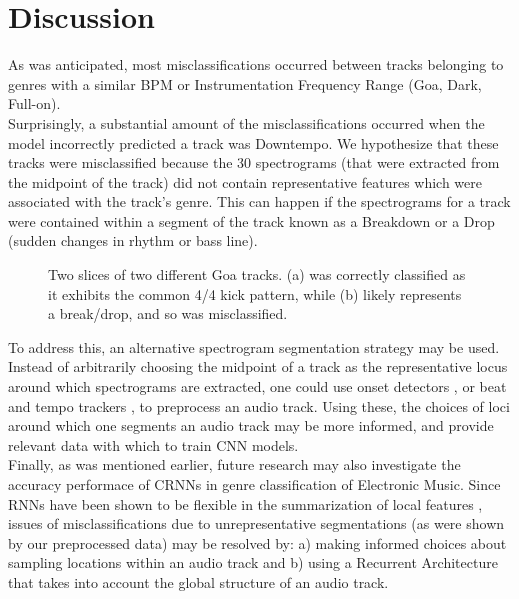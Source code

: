 \documentclass[12pt]{article}
\newcounter{ct}
\begin{document}
\section*{Discussion}
As was anticipated, most misclassifications occurred between tracks
belonging to
genres with a similar BPM or Instrumentation Frequency Range 
(Goa, Dark, Full-on). \\Surprisingly, a substantial amount of 
the misclassifications occurred when the model 
incorrectly predicted a track
was Downtempo. We hypothesize that these tracks were misclassified 
because the 30 spectrograms (that were
extracted from the midpoint of the track) 
did not contain representative features which were associated 
with the track's genre. This can happen if the spectrograms 
for a track were contained within a segment of the 
track known as a Breakdown or a Drop (sudden changes in 
rhythm or bass line).
\begin{figure}[H]%
    \centering
    \qquad\hspace{15mm}
    \caption{
        Two slices of two different Goa tracks. (a) was correctly 
        classified as it exhibits the common 4/4 kick pattern, while 
        (b) likely represents a break/drop, and so was misclassified.           
        }       
    \label{fig:example}%
\end{figure}

To address this, an alternative spectrogram segmentation strategy may 
be used.\\ Instead of arbitrarily choosing the midpoint of a track as the 
representative locus around which spectrograms are extracted,
one could use onset detectors \cite{c14}, or beat and tempo trackers 
\cite{c15}, to 
preprocess an audio track. Using these, the choices of loci
around which one segments an audio track may be more informed,
and provide relevant data with which to train CNN models.\\
Finally, as was mentioned earlier, future research may also 
investigate the accuracy performace of CRNNs in genre classification
of Electronic Music. Since RNNs have been shown to be flexible 
in the summarization of local features \cite{c6}, issues 
of misclassifications due to unrepresentative segmentations (as were
shown by our preprocessed data) may be resolved by: a) making
informed choices about sampling locations within an audio track and b)
using a Recurrent Architecture that takes into account the global
structure of an audio track.
\end{document}

